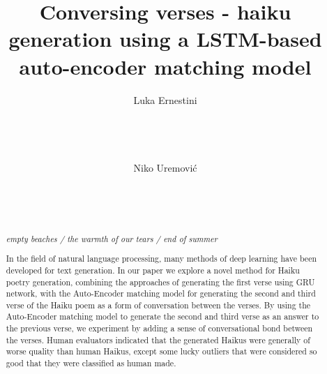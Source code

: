 \documentclass{acm_proc_article-sp}
\begin{document}
\title{Conversing verses - haiku generation using a LSTM-based auto-encoder matching model}

\author{
\alignauthor
Luka Ernestini\\
       \\
       \\
       \\

\alignauthor
Niko Uremović\\
       \\
       \\
       \\
}

\maketitle
\begin{abstract}

\emph{empty beaches / the warmth of our tears / end of summer}

In the field of natural language processing, many methods of deep learning have been developed for text generation. In our paper we explore a novel method for Haiku poetry generation, combining the approaches of generating the first verse using GRU network, with the Auto-Encoder matching model for generating the second and third verse of the Haiku poem as a form of conversation between the verses. By using the Auto-Encoder matching model to generate the second and third verse as an answer to the previous verse, we experiment by adding a sense of conversational bond between the verses. Human evaluators indicated that the generated Haikus were generally of worse quality than human Haikus, except some lucky outliers that were considered so good that they were classified as human made.

\end{abstract}



\end{document}

